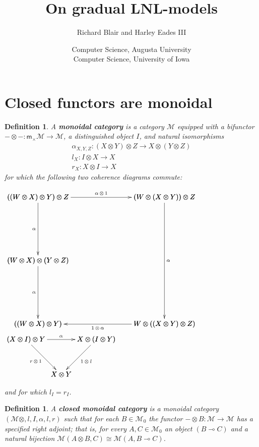 \documentclass{article}
\date{}
\newtheorem{definition}[theorem]{Definition}
\let\mto\to
\let\to\relax
\newcommand{\to}{\rightarrow}
\newcommand{\cat}[1]{\mathcal{#1}}
\newcommand{\lolli}{\multimap}
\newcommand{\m}[1]{\mathsf{m}_{#1}}
\begin{document}
\title{\vspace{-45px}On gradual LNL-models}
\author{Richard Blair and Harley Eades III}
\date{Computer Science, Augusta University\\Computer Science, University of Iowa}

\maketitle 

\section{Closed functors are monoidal}

\begin{definition} A \textbf{monoidal category} is a category $\cat{M}$ equipped with a bifunctor $ - \otimes - : \m \times \cat{M} \mto \cat{M}$, a distinguished object $I$, and natural isomorphisms
  \begin{gather}
    \alpha_{X,Y,Z} : (X \otimes Y) \otimes Z \mto X \otimes (Y \otimes Z) \\
    l_{X} : I \otimes X \mto X \\
    r_{X} : X \otimes I \mto X
  \end{gather}
  for which the following two coherence diagrams commute:
\begin{center}
  \begin{math}
    \bfig
    \node botleft(0,0)[((W \otimes X) \otimes Y)]
    \node midleft(0,900)[(W \otimes X) \otimes (Y \otimes Z)]
    \node topleft(0,1800)[((W \otimes X) \otimes Y) \otimes Z]
    \node botright(1800,0)[W \otimes ((X \otimes Y) \otimes Z)]
    \node topright(1800,1800)[(W \otimes (X \otimes Y)) \otimes Z]
    \arrow[topleft`midleft; \alpha]
    \arrow[midleft`botleft; \alpha]
    \arrow|b|/<-/[botleft`botright; 1 \, \otimes \, \alpha]
    \arrow[topleft`topright; \alpha \, \otimes \, 1]
    \arrow|r|[topright`botright; \alpha]
    \efig
  \end{math}
  \vspace{15px}
  \begin{math}
    \bfig
    \Vtriangle[(X \otimes I) \otimes Y`X \otimes (I \otimes Y)`X \otimes Y;\alpha`r \, \otimes \, 1`1 \, \otimes \: l]
    \efig
  \end{math}
\end{center}
and for which $l_I = r_I$.
\end{definition}

\begin{definition}
A \textbf{closed monoidal category} is a monoidal category $(\cat{M} \otimes, l, I, \alpha, l, r)$ such that for each $B \in \cat{M}_0$ the functor $- \otimes B : \cat{M} \mto \cat{M}$ has a specified right adjoint; that is, for every $A, C \in \cat{M}_0$ an object $(B \lolli C)$ and a natural bijection $\cat{M}(A \otimes B, C) \cong \cat{M}(A, B \lolli C)$.
\end{definition}
\end{document}
